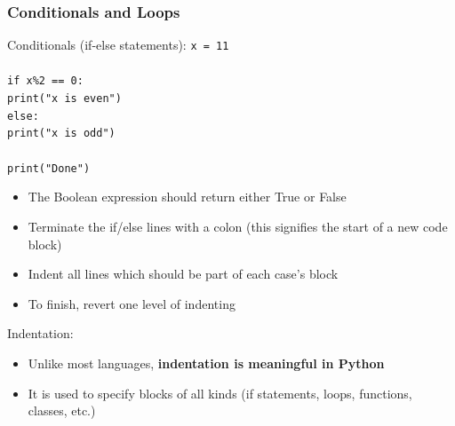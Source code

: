 \documentclass{beamer}
\newcommand{\code}[1]{\texttt{#1}}
\newcommand{\tab}{\hspace*{22pt}}
\begin{document}
\begin{frame}%
	\frametitle{Conditionals and Loops}
	
	\begin{block}{Conditionals (if-else statements):}
			\code{x = 11 \\
				\tab \\
				if x\%2 == 0: \\
				\tab print("x is even") \\
				else: \\
				\tab print("x is odd") \\
				\tab \\
				print("Done")}
				
				\vspace{10pt}
		\endminipage\hfill
			\begin{itemize}
				\item The Boolean expression should return either True or False
				\item Terminate the if/else lines with a colon (this signifies the start of a new code block)
				\item Indent all lines which should be part of each case's block
				\item To finish, revert one level of indenting
			\end{itemize}
		\endminipage\hfill
		
		\vspace{1pt}
		
		Indentation:
		\begin{itemize}
			\item Unlike most languages, \textbf{indentation is meaningful in Python}
			\item It is used to specify blocks of all kinds (if statements, loops, functions, classes, etc.)
		\end{itemize}
	\end{block}
	
\end{frame}
\end{document}
